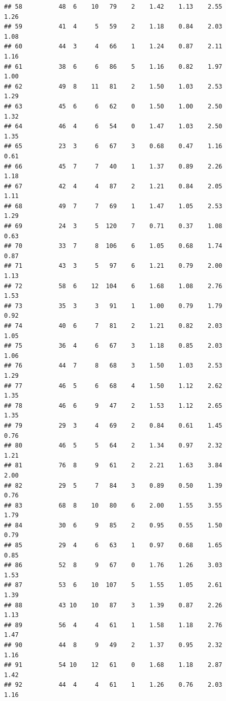 \documentclass[
]{book}
\theoremstyle{definition}
\theoremstyle{definition}
\theoremstyle{definition}
\theoremstyle{definition}
\theoremstyle{remark}
\begin{document}
\begin{verbatim}
## 58          48  6    10   79    2    1.42    1.13    2.55           1.26
## 59          41  4     5   59    2    1.18    0.84    2.03           1.08
## 60          44  3     4   66    1    1.24    0.87    2.11           1.16
## 61          38  6     6   86    5    1.16    0.82    1.97           1.00
## 62          49  8    11   81    2    1.50    1.03    2.53           1.29
## 63          45  6     6   62    0    1.50    1.00    2.50           1.32
## 64          46  4     6   54    0    1.47    1.03    2.50           1.35
## 65          23  3     6   67    3    0.68    0.47    1.16           0.61
## 66          45  7     7   40    1    1.37    0.89    2.26           1.18
## 67          42  4     4   87    2    1.21    0.84    2.05           1.11
## 68          49  7     7   69    1    1.47    1.05    2.53           1.29
## 69          24  3     5  120    7    0.71    0.37    1.08           0.63
## 70          33  7     8  106    6    1.05    0.68    1.74           0.87
## 71          43  3     5   97    6    1.21    0.79    2.00           1.13
## 72          58  6    12  104    6    1.68    1.08    2.76           1.53
## 73          35  3     3   91    1    1.00    0.79    1.79           0.92
## 74          40  6     7   81    2    1.21    0.82    2.03           1.05
## 75          36  4     6   67    3    1.18    0.85    2.03           1.06
## 76          44  7     8   68    3    1.50    1.03    2.53           1.29
## 77          46  5     6   68    4    1.50    1.12    2.62           1.35
## 78          46  6     9   47    2    1.53    1.12    2.65           1.35
## 79          29  3     4   69    2    0.84    0.61    1.45           0.76
## 80          46  5     5   64    2    1.34    0.97    2.32           1.21
## 81          76  8     9   61    2    2.21    1.63    3.84           2.00
## 82          29  5     7   84    3    0.89    0.50    1.39           0.76
## 83          68  8    10   80    6    2.00    1.55    3.55           1.79
## 84          30  6     9   85    2    0.95    0.55    1.50           0.79
## 85          29  4     6   63    1    0.97    0.68    1.65           0.85
## 86          52  8     9   67    0    1.76    1.26    3.03           1.53
## 87          53  6    10  107    5    1.55    1.05    2.61           1.39
## 88          43 10    10   87    3    1.39    0.87    2.26           1.13
## 89          56  4     4   61    1    1.58    1.18    2.76           1.47
## 90          44  8     9   49    2    1.37    0.95    2.32           1.16
## 91          54 10    12   61    0    1.68    1.18    2.87           1.42
## 92          44  4     4   61    1    1.26    0.76    2.03           1.16

\end{verbatim}
\end{document}
